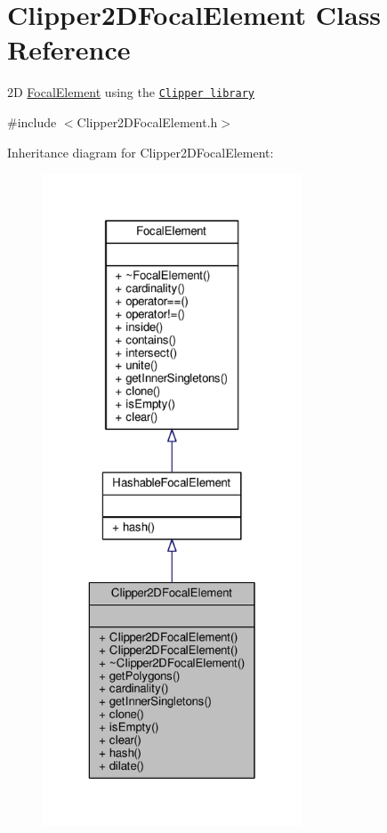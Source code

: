 \hypertarget{classClipper2DFocalElement}{}\section{Clipper2\+D\+Focal\+Element Class Reference}
\label{classClipper2DFocalElement}


2D \hyperlink{classFocalElement}{Focal\+Element} using the \href{http://www.angusj.com/delphi/clipper.php}{\tt Clipper library}  




{\ttfamily \#include $<$Clipper2\+D\+Focal\+Element.\+h$>$}



Inheritance diagram for Clipper2\+D\+Focal\+Element\+:\nopagebreak
\begin{figure}[H]
\begin{center}
\leavevmode
\includegraphics[height=550pt]{classClipper2DFocalElement__inherit__graph}
\end{center}
\end{figure}


